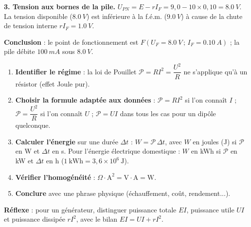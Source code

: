 \documentclass[11pt]{article}
\newcommand{\cle}[1]{{\popxbold\color{popdark}#1}}
\begin{document}
\begin{exoresolu}
\textbf{3. Tension aux bornes de la pile.} $U_{PN} = E - rI_F = 9{,}0 - 10 \times 0{,}10 = \SI{8,0}{V}$. La tension disponible ($\SI{8,0}{V}$) est inférieure à la f.é.m. ($\SI{9,0}{V}$) à cause de la chute de tension interne $rI_F = \SI{1,0}{V}$.

\textbf{Conclusion} : le point de fonctionnement est $F(U_F = \SI{8,0}{V}\,;\,I_F = \SI{0,10}{A})$ ; la pile débite $\SI{100}{mA}$ sous $\SI{8,0}{V}$.
\end{exoresolu}

\begin{methode}
\begin{enumerate}
\item \textbf{Identifier le régime} : la loi de Pouillet $\mathcal{P} = RI^2 = \dfrac{U^2}{R}$ ne s'applique qu'à un \cle{résistor} (effet Joule pur).
\item \textbf{Choisir la formule adaptée aux données} : $\mathcal{P} = RI^2$ si l'on connaît $I$ ; $\mathcal{P} = \dfrac{U^2}{R}$ si l'on connaît $U$ ; $\mathcal{P} = UI$ dans tous les cas pour un dipôle quelconque.
\item \textbf{Calculer l'énergie} sur une durée $\Delta t$ : $W = \mathcal{P}\,\Delta t$, avec $W$ en joules (J) si $\mathcal{P}$ en W et $\Delta t$ en s. Pour l'énergie électrique domestique : $W$ en kWh si $\mathcal{P}$ en kW et $\Delta t$ en h ($1~\mathrm{kWh} = 3{,}6 \times 10^{6}~\mathrm{J}$).
\item \textbf{Vérifier l'homogénéité} : $\Omega \cdot \mathrm{A}^2 = \mathrm{V \cdot A} = \mathrm{W}$.
\item \textbf{Conclure} avec une phrase physique (échauffement, coût, rendement...).
\end{enumerate}
\textbf{Réflexe} : pour un générateur, distinguer puissance totale $EI$, puissance utile $UI$ et puissance dissipée $rI^2$, avec le bilan $EI = UI + rI^2$.
\end{methode}
\end{document}
